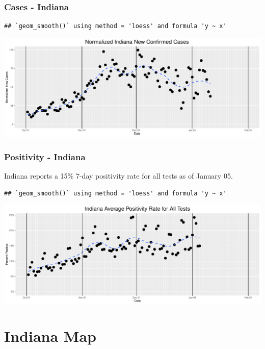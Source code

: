 \documentclass[
]{article}
\begin{document}
\hypertarget{cases---indiana}{%
\subsubsection{Cases - Indiana}\label{cases---indiana}}

\begin{verbatim}
## `geom_smooth()` using method = 'loess' and formula 'y ~ x'
\end{verbatim}

\includegraphics{Grace_internal4_files/figure-latex/unnamed-chunk-17-1.pdf}

\hypertarget{positivity---indiana}{%
\subsubsection{Positivity - Indiana}\label{positivity---indiana}}

Indiana reports a 15\% 7-day positivity rate for all tests as of January
05.

\begin{verbatim}
## `geom_smooth()` using method = 'loess' and formula 'y ~ x'
\end{verbatim}

\includegraphics{Grace_internal4_files/figure-latex/unnamed-chunk-18-1.pdf}

\newpage

\hypertarget{indiana-map}{%
\section{Indiana Map}\label{indiana-map}}
\end{document}
